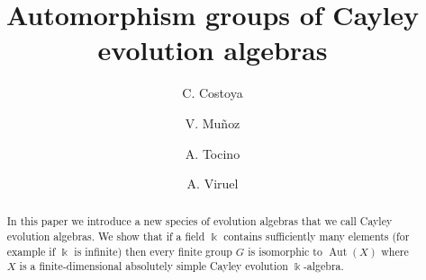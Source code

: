 \documentclass[a4paper,12pt]{amsart}
\theoremstyle{definition}
\theoremstyle{remark}
\newcommand{\Aut}{\operatorname{Aut}}
\begin{document}
\title{Automorphism groups of Cayley evolution algebras}
\author{C. Costoya}
\address{CITIC, CITMAGA, Departamento de Ciencias de la Computaci{\'o}n y Tecnolog{\'\i}as de la Informaci{\'o}n,
Universidade da Coru{\~n}a, 15071-A Coru{\~n}a, Spain.}

\author{V. Mu{\~n}oz}
\address{Departamento de \'Algebra, Geometr{\'\i}a y Topolog{\'\i}a, Universidad de M{\'a}laga, 29071-M{\'a}laga, Spain}

\author{A. Tocino}
\address{Departamento de Matem\'atica Aplicada, Universidad de M{\'a}laga, 29071-M{\'a}laga, Spain}

\author{A. Viruel}
\address{Departamento de \'Algebra, Geometr{\'\i}a y Topolog{\'\i}a, Universidad de M{\'a}laga, 29071-M{\'a}laga, Spain}




\begin{abstract}
In this paper we introduce a new species of evolution algebras that we call Cayley evolution algebras.
We show that if  a field  $\Bbbk$ contains sufficiently many elements (for example if $\Bbbk $ is infinite) then every finite group 
$G$ is isomorphic to $\Aut (X)$ where $X$ is a finite-dimensional absolutely simple Cayley evolution $\Bbbk$-algebra. 
\end{abstract}

\maketitle
\end{document}

